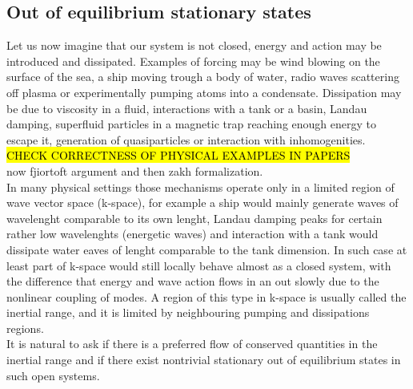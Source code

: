 \subsection{Out of equilibrium stationary states}

Let us now imagine that our system is not closed, energy and action may be introduced and dissipated. Examples of forcing may be wind blowing on the surface of the sea, 
a ship moving trough a body of water, radio waves scattering off plasma or experimentally pumping atoms into a condensate. Dissipation may be due to viscosity in a fluid,
interactions with a tank or a basin, Landau damping, superfluid particles in a magnetic trap reaching enough energy to escape it, generation of quasiparticles or interaction 
with inhomogenities. \hl{CHECK CORRECTNESS OF PHYSICAL EXAMPLES IN PAPERS} \\
now fjiortoft argument and then zakh formalization.\\
In many physical settings those mechanisms operate only in a limited region of wave vector space (k-space), for example a ship would mainly generate waves of wavelenght comparable to 
its own lenght, Landau damping peaks for certain rather low wavelenghts (energetic waves) and interaction with a tank would dissipate water eaves of lenght comparable to the tank dimension. In such 
case at least part of  k-space would still locally behave almost as a closed system, with the difference that energy and wave action flows in an out slowly due to the nonlinear 
coupling of modes. A region of this type in k-space is usually called the inertial range, and it is limited by neighbouring pumping and dissipations regions.\\
It is natural to ask if there is a preferred flow of conserved quantities in the inertial range and if there exist nontrivial stationary out of equilibrium 
states in such open systems. \\
